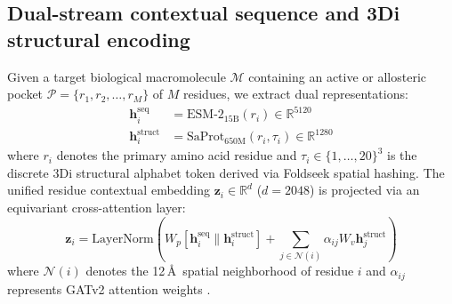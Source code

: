 \documentclass[11pt,a4paper]{article}
\begin{document}
\subsection*{Dual-stream contextual sequence and 3Di structural encoding}
Given a target biological macromolecule $\mathcal{M}$ containing an active or allosteric pocket $\mathcal{P} = \{r_1, r_2, \dots, r_M\}$ of $M$ residues, we extract dual representations:
\begin{align}
\mathbf{h}_i^{\text{seq}} &= \text{ESM-2}_{15\text{B}}(r_i) \in \mathbb{R}^{5120} \\
\mathbf{h}_i^{\text{struct}} &= \text{SaProt}_{650\text{M}}(r_i, \tau_i) \in \mathbb{R}^{1280}
\end{align}
where $r_i$ denotes the primary amino acid residue and $\tau_i \in \{1, \dots, 20\}^3$ is the discrete 3Di structural alphabet token derived via Foldseek spatial hashing. The unified residue contextual embedding $\mathbf{z}_i \in \mathbb{R}^{d}$ ($d = 2048$) is projected via an equivariant cross-attention layer:
\begin{equation}
\mathbf{z}_i = \text{LayerNorm}\left( W_p [\mathbf{h}_i^{\text{seq}} \parallel \mathbf{h}_i^{\text{struct}}] + \sum_{j \in \mathcal{N}(i)} \alpha_{ij} W_v \mathbf{h}_j^{\text{struct}} \right)
\end{equation}
where $\mathcal{N}(i)$ denotes the 12\,\AA\ spatial neighborhood of residue $i$ and $\alpha_{ij}$ represents GATv2 attention weights \cite{brody2022attentive}.

\end{document}
